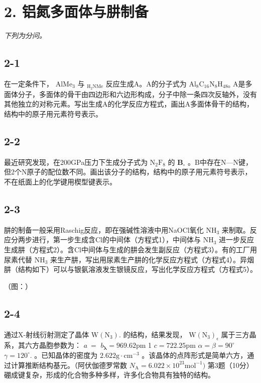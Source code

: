 \section*{2. 铝氮多面体与肼制备}
\textit{下列为分问。}

\subsection*{2-1}
在⼀定条件下， $\mathrm { A l M e _ { 3 } }$ 与 $_ \mathrm { H _ { 2 } N M e }$ 反应⽣成A。A的分⼦式为 $\mathrm { A l _ { 8 } C _ { 1 6 } N _ { 8 } H _ { 4 8  o } }$ A是多⾯体分⼦，多⾯体的⻣⼲由四边形和六边形构成，分⼦中除⼀条四次反轴外，没有其他独⽴的对称元素。写出⽣成A的化学反应⽅程式，画出A多⾯体⻣⼲的结构，结构中的原⼦⽤元素符号表⽰。

\subsection*{2-2}
最近研究发现，在200GPa压⼒下⽣成分⼦式为 $\mathrm { N _ { 2 } F _ { 8 } }$ 的 $\mathbf { B } _ { \circ }$ 。B中存在N—N键，但2个N原⼦的配位数不同。画出该分⼦的结构，结构中的原⼦⽤元素符号表⽰，不在纸⾯上的化学键⽤楔型键表⽰。

\subsection*{2-3}
肼的制备⼀般采⽤Raschig反应，即在强碱性溶液中⽤NaOCl氧化 $\mathrm { N H _ { 3 } }$ 来制取。反应分两步进⾏，第⼀步⽣成含Cl的中间体（⽅程式1），中间体与 $\mathrm { N H _ { 3 } }$ 进⼀步反应⽣成肼（⽅程式2）。含Cl中间体与⽣成的肼会发⽣副反应（⽅程式3）。有的⼯⼚⽤尿素代替 $\mathrm { N H _ { 3 } }$ 来⽣产肼，写出⽤尿素⽣产肼的化学反应⽅程式（⽅程式4）。异烟肼（结构如下）可以与银氨溶液发⽣银镜反应，写出化学反应⽅程式（⽅程式5）。

（图：）

\subsection*{2-4}
通过X-射线衍射测定了晶体 $\mathrm { W } ( \mathrm { N } _ { 3 } ) .$ 的结构，结果发现， $\mathrm { W } ( \mathrm { N } _ { 3 } ) _ { \epsilon }$ 属于三⽅晶系，其六⽅晶胞参数为： $a \ =$ $b _ { \mathbf { \lambda } } = 9 6 9 . 6 2 \mathrm { p m }$ 1 $c = 7 2 2 . 2 5 \mathrm { p m }$ $\alpha = \beta = 9 0 ^ { \circ }$ $\gamma = 1 2 0 ^ { \circ } .$ 。已知晶体的密度为 $2 . 6 2 2 \mathrm { g } { \cdot } \mathrm { c m } ^ { - 3 }$ 。该晶体的点阵形式是简单六⽅，通过计算推断结构基元。（阿伏伽德罗常数 $N _ { \mathrm { A } } = 6 . 0 2 2 \times 1 0 ^ { 2 3 } \mathrm { m o l ^ { - 1 } } )$ 第3题（10分）硼成键复杂，形成的化合物多种多样，许多化合物具有独特的结构。

